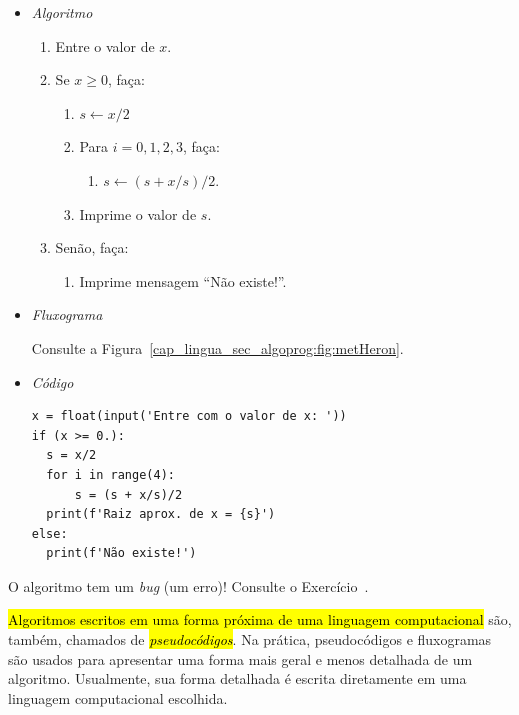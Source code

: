 \begin{ex}
  \begin{itemize}
  \item \emph{Algoritmo}
    \begin{enumerate}
    \item Entre o valor de $x$.
    \item Se $x\geq 0$, faça:
      \begin{enumerate}
      \item $s \leftarrow x/2$
      \item Para $i = 0,1,2,3$, faça:
        \begin{enumerate}
        \item $s \leftarrow (s + x/s)/2$.
        \end{enumerate}
      \item Imprime o valor de $s$.
      \end{enumerate}
    \item Senão, faça:
      \begin{enumerate}
      \item Imprime mensagem ``Não existe!''.
      \end{enumerate}
    \end{enumerate}

  \item \emph{Fluxograma}
  
    Consulte a Figura~\ref{cap_lingua_sec_algoprog:fig:metHeron}.
    
  \item \emph{Código {\python}}

\begin{lstlisting}[caption=metHeron.py,label=cap_lingua_sec_algoprog:cod:metHeron, xrightmargin=2.5em]
x = float(input('Entre com o valor de x: '))
if (x >= 0.):
  s = x/2
  for i in range(4):
      s = (s + x/s)/2
  print(f'Raiz aprox. de x = {s}')
else:
  print(f'Não existe!')
\end{lstlisting}

  \end{itemize}

  O algoritmo tem um \textit{bug} (um erro)! Consulte o Exercício~.
\end{ex}

\hl{Algoritmos escritos em uma forma próxima de uma linguagem computacional} são, também, chamados de \hl{\emph{pseudocódigos}}. Na prática, pseudocódigos e fluxogramas são usados para apresentar uma forma mais geral e menos detalhada de um algoritmo. Usualmente, sua forma detalhada é escrita diretamente em uma linguagem computacional escolhida.

